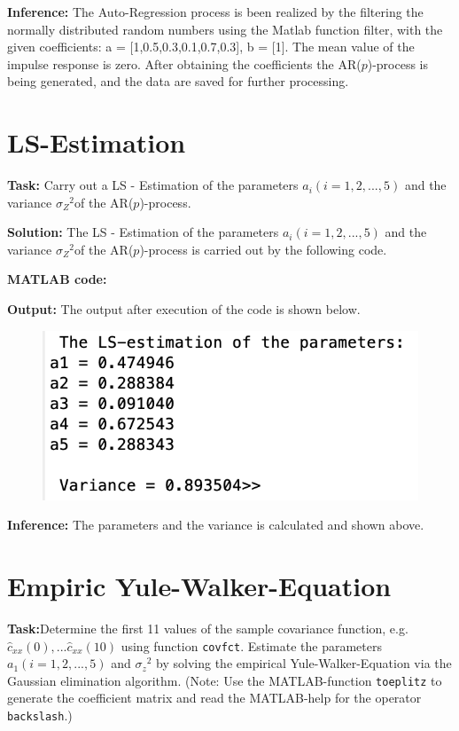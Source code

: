 \noindent \textbf{Inference:} The Auto-Regression process is been realized by the filtering the normally distributed random numbers using the Matlab function filter, with the given coefficients: a = [1,0.5,0.3,0.1,0.7,0.3], b = [1]. The mean value of the impulse response is zero.  After obtaining the coefficients the AR($p$)-process is being generated, and the data are saved for further processing.

\newpage

\section{ LS-Estimation } \label{ LS-Estimation  }
\noindent \textbf{Task:} Carry out a LS - Estimation of the parameters $a_i(i=1,2,...,5)$ and the variance ${\sigma_Z}^2$of the AR($p$)-process.

\noindent \textbf{Solution:}  
\noindent The LS - Estimation of the parameters $a_i(i=1,2,...,5)$ and the variance ${\sigma_Z}^2$of the AR($p$)-process is carried out by the following code.

\noindent \textbf{MATLAB code:}


\noindent \textbf{Output:}
\noindent The output after execution of the code is shown below. 
\begin{figure}[H]
\centering
{\includegraphics[scale=1.15]{ass3_1.png}}
\end{figure}

\noindent \textbf{Inference:} The parameters and the variance is calculated and shown above.



\section{ Empiric Yule-Walker-Equation  } \label{ Empiric Yule-Walker-Equation l}
\noindent \textbf{Task:}Determine the first 11 values of the sample covariance function, e.g.  $\hat{c}_{xx}(0),...\hat{c}_{xx}(10)$ using function \texttt{covfct}. Estimate the parameters $a_1(i=1,2,...,5)$ and ${\sigma_z}^2$ by solving the empirical Yule-Walker-Equation via the Gaussian elimination algorithm. (Note: Use the MATLAB-function \texttt{toeplitz} to generate the coefficient matrix and read the MATLAB-help for the operator \texttt{backslash}.)

